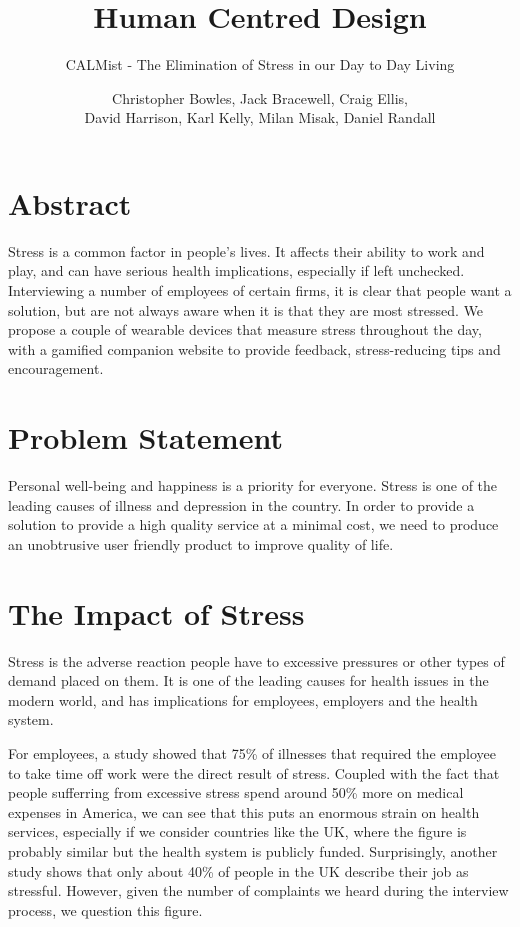 \documentclass{scrartcl}
\title{Human Centred Design}
\subtitle{CALMist - The Elimination of Stress in our Day to Day Living}
\author{Christopher Bowles, Jack Bracewell, Craig Ellis,\\David Harrison, Karl Kelly, Milan Misak, Daniel Randall}
\date{}
\begin{document}
\maketitle
\tableofcontents
\clearpage

\section{Abstract}
Stress is a common factor in people's lives. It affects their ability to work and play, and can have serious health
implications, especially if left unchecked. Interviewing a number of employees of certain firms, it is clear that
people want a solution, but are not always aware when it is that they are most stressed. We propose a couple of
wearable devices that measure stress throughout the day, with a gamified companion website to provide feedback,
stress-reducing tips and encouragement.

\section{Problem Statement}
Personal well-being and happiness is a priority for everyone.
Stress is one of the leading causes of illness and depression in the country.
In order to provide a solution to provide a high quality service at a minimal cost,
we need to produce an unobtrusive user friendly product to improve quality of life.

\section{The Impact of Stress}
Stress is the adverse reaction people have to excessive pressures or other types of demand placed on them.
It is one of the leading causes for health issues in the modern world, and has implications for
employees, employers and the health system.

For employees, a study showed that 75\% of illnesses that required the employee to take time off work were
the direct result of stress. Coupled with the fact that people sufferring from excessive stress spend around 50\%
more on medical expenses in America, we can see that this puts an enormous strain on health services, especially
if we consider countries like the UK, where the figure is probably similar but the health system is publicly funded.
Surprisingly, another study shows that only about 40\% of people in the UK describe their job as stressful. However,
given the number of complaints we heard during the interview process, we question this figure.
\end{document}

